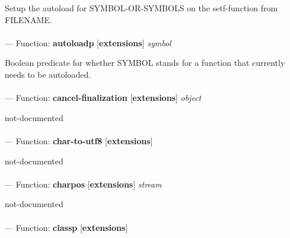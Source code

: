 \begin{adjustwidth}{5em}{5em}
Setup the autoload for SYMBOL-OR-SYMBOLS on the setf-function from FILENAME.
\end{adjustwidth}

\paragraph{}
\label{EXTENSIONS:AUTOLOADP}
--- Function: \textbf{autoloadp} [\textbf{extensions}] \textit{symbol}

\begin{adjustwidth}{5em}{5em}
Boolean predicate for whether SYMBOL stands for a function that currently needs to be autoloaded.
\end{adjustwidth}

\paragraph{}
\label{EXTENSIONS:CANCEL-FINALIZATION}
--- Function: \textbf{cancel-finalization} [\textbf{extensions}] \textit{object}

\begin{adjustwidth}{5em}{5em}
not-documented
\end{adjustwidth}

\paragraph{}
\label{EXTENSIONS:CHAR-TO-UTF8}
--- Function: \textbf{char-to-utf8} [\textbf{extensions}] \textit{}

\begin{adjustwidth}{5em}{5em}
not-documented
\end{adjustwidth}

\paragraph{}
\label{EXTENSIONS:CHARPOS}
--- Function: \textbf{charpos} [\textbf{extensions}] \textit{stream}

\begin{adjustwidth}{5em}{5em}
not-documented
\end{adjustwidth}

\paragraph{}
\label{EXTENSIONS:CLASSP}
--- Function: \textbf{classp} [\textbf{extensions}] \textit{}

